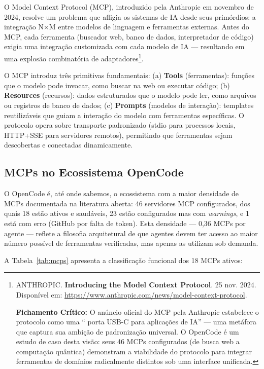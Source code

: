 O Model Context Protocol (MCP), introduzido pela Anthropic em novembro de 2024, resolve um problema que afligia os sistemas de IA desde seus primórdios: a integração N×M entre modelos de linguagem e ferramentas externas. Antes do MCP, cada ferramenta (buscador web, banco de dados, interpretador de código) exigia uma integração customizada com cada modelo de IA --- resultando em uma explosão combinatória de adaptadores\footnote{
  ANTHROPIC. \textbf{Introducing the Model Context Protocol}. 25 nov. 2024. Disponível em: \url{https://www.anthropic.com/news/model-context-protocol}.

  \textbf{Fichamento Crítico:} O anúncio oficial do MCP pela Anthropic estabelece o protocolo como uma `` porta USB-C para aplicações de IA'' --- uma metáfora que captura sua ambição de padronização universal. O OpenCode é um estudo de caso desta visão: seus 46 MCPs configurados (de busca web a computação quântica) demonstram a viabilidade do protocolo para integrar ferramentas de domínios radicalmente distintos sob uma interface unificada.
}.

O MCP introduz três primitivas fundamentais: (a) \textbf{Tools} (ferramentas): funções que o modelo pode invocar, como buscar na web ou executar código; (b) \textbf{Resources} (recursos): dados estruturados que o modelo pode ler, como arquivos ou registros de banco de dados; (c) \textbf{Prompts} (modelos de interação): templates reutilizáveis que guiam a interação do modelo com ferramentas específicas. O protocolo opera sobre transporte padronizado (stdio para processos locais, HTTP+SSE para servidores remotos), permitindo que ferramentas sejam descobertas e conectadas dinamicamente.

\subsection{MCPs no Ecossistema OpenCode}

O OpenCode é, até onde sabemos, o ecossistema com a maior densidade de MCPs documentada na literatura aberta: 46 servidores MCP configurados, dos quais 18 estão ativos e saudáveis, 23 estão configurados mas com \textit{warnings}, e 1 está com erro (GitHub por falta de token). Esta densidade --- 0,36 MCPs por agente --- reflete a filosofia arquitetural de que agentes devem ter acesso ao maior número possível de ferramentas verificadas, mas apenas as utilizam sob demanda.

A Tabela~\ref{tab:mcps} apresenta a classificação funcional dos 18 MCPs ativos:

